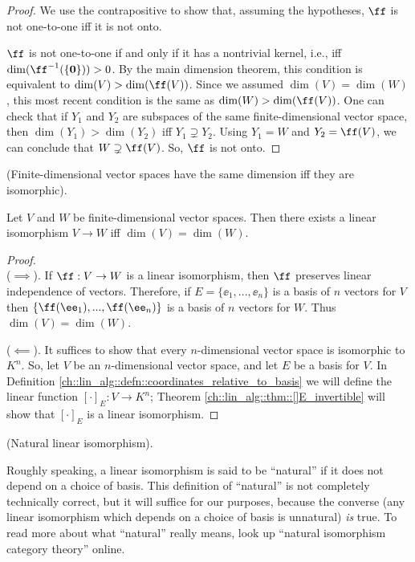 \begin{proof}
    We use the contrapositive to show that, assuming the hypotheses, $\ff$ is not one-to-one iff it is not onto.
    
    $\ff$ is not one-to-one if and only if it has a nontrivial kernel, i.e., iff $\dim(\ff^{-1}(\{\mathbf{0}\})) > 0$. By the main dimension theorem, this condition is equivalent to $\dim(V) > \dim(\ff(V))$. Since we assumed $\dim(V) = \dim(W)$, this most recent condition is the same as $\dim(W) > \dim(\ff(V))$. One can check that if $Y_1$ and $Y_2$ are subspaces of the same finite-dimensional vector space, then $\dim(Y_1) > \dim(Y_2)$ iff $Y_1 \supsetneq Y_2$. Using $Y_1 = W$ and $Y_2 = \ff(V)$, we can conclude that $W \supsetneq \ff(V)$. So, $\ff$ is not onto.
\end{proof}

\begin{theorem}
\label{ch::lin_alg::thm::same_dim_iff_isomorphic}
    (Finite-dimensional vector spaces have the same dimension iff they are isomorphic).
    
    Let $V$ and $W$ be finite-dimensional vector spaces. Then there exists a linear isomorphism $V \rightarrow W$ iff $\dim(V) = \dim(W)$.
\end{theorem}

\begin{proof}
    \mbox{} \\ \indent
    ($\implies$). If $\ff:V \rightarrow W$ is a linear isomorphism, then $\ff$ preserves linear independence of vectors. Therefore, if $E = \{\ee_1, ..., \ee_n\}$ is a basis of $n$ vectors for $V$ then $\{\ff(\ee_1), ..., \ff(\ee_n)\}$ is a basis of $n$ vectors for $W$. Thus $\dim(V) = \dim(W)$.
    
    ($\impliedby$). It suffices to show that every $n$-dimensional vector space is isomorphic to $K^n$. So, let $V$ be an $n$-dimensional vector space, and let $E$ be a basis for $V$. In Definition \ref{ch::lin_alg::defn::coordinates_relative_to_basis} we will define the linear function $[\cdot]_E:V \rightarrow K^n$; Theorem \ref{ch::lin_alg::thm::[]E_invertible} will show that $[\cdot]_E$ is a linear isomorphism.
\end{proof}

\begin{defn}
\label{ch::lin_alg::defn::natural_iso}
    (Natural linear isomorphism).
    
    Roughly speaking, a linear isomorphism is said to be ``natural'' if it does not depend on a choice of basis. This definition of ``natural'' is not completely technically correct, but it will suffice for our purposes, because the converse (any linear isomorphism which depends on a choice of basis is unnatural) \textit{is} true. To read more about what ``natural'' really means, look up ``natural isomorphism category theory'' online.
\end{defn}

